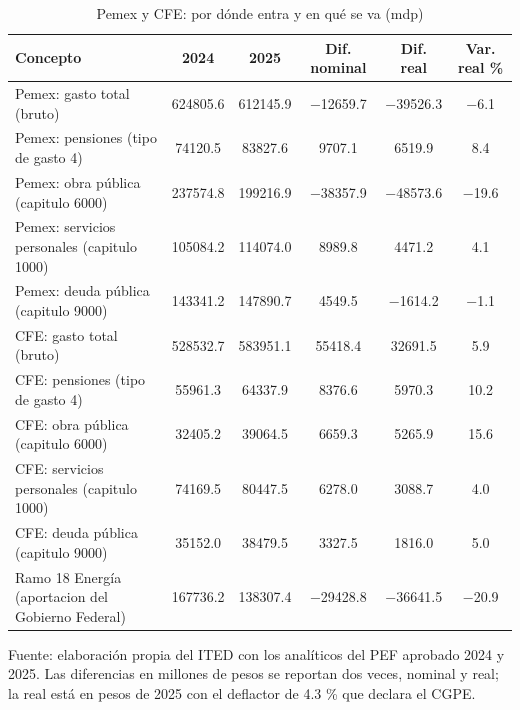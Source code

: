 \begin{table}[htbp]
\centering
\caption{Pemex y CFE: por dónde entra y en qué se va (mdp)}
\label{tab:C9_2}
\footnotesize
\setlength{\tabcolsep}{4pt}
\begin{tabular}{L{4.2cm}SSSSS}
\toprule
{Concepto} & {2024} & {2025} & {Dif. nominal} & {Dif. real} & {Var. real \%} \\
\midrule
{Pemex: gasto total (bruto)} & \num{624805.6} & \num{612145.9} & \num{-12659.7} & \num{-39526.3} & \num{-6.1} \\
{Pemex: pensiones (tipo de gasto 4)} & \num{74120.5} & \num{83827.6} & \num{9707.1} & \num{6519.9} & \num{8.4} \\
{Pemex: obra pública (capitulo 6000)} & \num{237574.8} & \num{199216.9} & \num{-38357.9} & \num{-48573.6} & \num{-19.6} \\
{Pemex: servicios personales (capitulo 1000)} & \num{105084.2} & \num{114074.0} & \num{8989.8} & \num{4471.2} & \num{4.1} \\
{Pemex: deuda pública (capitulo 9000)} & \num{143341.2} & \num{147890.7} & \num{4549.5} & \num{-1614.2} & \num{-1.1} \\
{CFE: gasto total (bruto)} & \num{528532.7} & \num{583951.1} & \num{55418.4} & \num{32691.5} & \num{5.9} \\
{CFE: pensiones (tipo de gasto 4)} & \num{55961.3} & \num{64337.9} & \num{8376.6} & \num{5970.3} & \num{10.2} \\
{CFE: obra pública (capitulo 6000)} & \num{32405.2} & \num{39064.5} & \num{6659.3} & \num{5265.9} & \num{15.6} \\
{CFE: servicios personales (capitulo 1000)} & \num{74169.5} & \num{80447.5} & \num{6278.0} & \num{3088.7} & \num{4.0} \\
{CFE: deuda pública (capitulo 9000)} & \num{35152.0} & \num{38479.5} & \num{3327.5} & \num{1816.0} & \num{5.0} \\
{Ramo 18 Energía (aportacion del Gobierno Federal)} & \num{167736.2} & \num{138307.4} & \num{-29428.8} & \num{-36641.5} & \num{-20.9} \\
\bottomrule
\end{tabular}
\par\vspace{2pt}\footnotesize Fuente: elaboración propia del ITED con los analíticos del PEF aprobado 2024 y 2025. Las diferencias en millones de pesos se reportan dos veces, nominal y real; la real está en pesos de 2025 con el deflactor de 4.3 \% que declara el CGPE.
\end{table}
